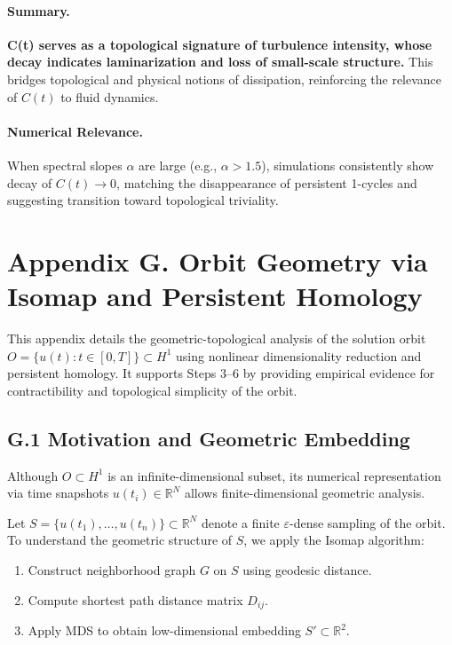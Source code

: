 \documentclass[11pt]{article}
\theoremstyle{definition}
\begin{document}
\paragraph{Summary.} \textbf{C(t) serves as a topological signature of turbulence intensity, whose decay indicates laminarization and loss of small-scale structure.} This bridges topological and physical notions of dissipation, reinforcing the relevance of \( C(t) \) to fluid dynamics.

\paragraph{Numerical Relevance.} When spectral slopes \( \alpha \) are large (e.g., \( \alpha > 1.5 \)), simulations consistently show decay of \( C(t) \to 0 \), matching the disappearance of persistent 1-cycles and suggesting transition toward topological triviality.


\section*{Appendix G. Orbit Geometry via Isomap and Persistent Homology}
\label{sec:appendixG}

This appendix details the geometric-topological analysis of the solution orbit \( O = \{ u(t) : t \in [0,T] \} \subset H^1 \) using nonlinear dimensionality reduction and persistent homology. It supports Steps 3--6 by providing empirical evidence for contractibility and topological simplicity of the orbit.

\subsection*{G.1 Motivation and Geometric Embedding}

Although \( O \subset H^1 \) is an infinite-dimensional subset, its numerical representation via time snapshots \( u(t_i) \in \mathbb{R}^N \) allows finite-dimensional geometric analysis.

Let \( S = \{ u(t_1), \ldots, u(t_n) \} \subset \mathbb{R}^N \) denote a finite \( \varepsilon \)-dense sampling of the orbit. To understand the geometric structure of \( S \), we apply the Isomap algorithm:

\begin{enumerate}
  \item Construct neighborhood graph \( G \) on \( S \) using geodesic distance.
  \item Compute shortest path distance matrix \( D_{ij} \).
  \item Apply MDS to obtain low-dimensional embedding \( S' \subset \mathbb{R}^2 \).
\end{enumerate}
\end{document}
